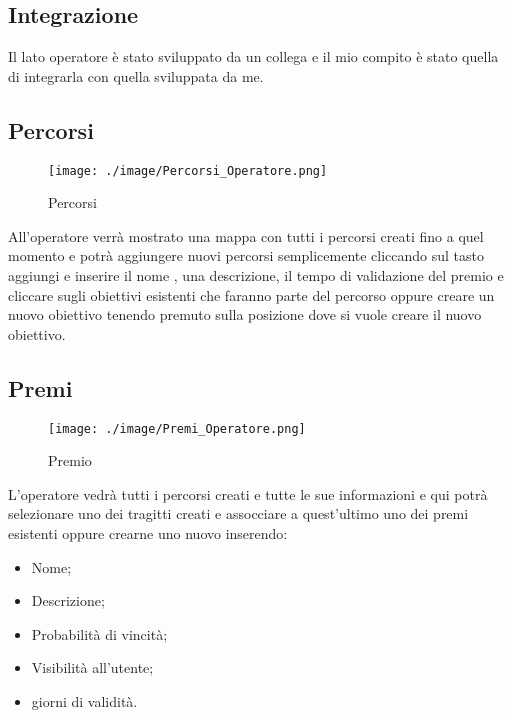 \subsection{Integrazione}
\vspace{2em}

Il lato operatore è stato sviluppato da un collega e il mio compito è stato quella di integrarla con quella sviluppata da me.
\clearpage

\subsection{Percorsi}
\vspace{2em}

\begin{wrapfigure}{L}{0.45\textwidth}
\centering
\texttt{[image: ./image/Percorsi\_Operatore.png]}
\caption{\label{fig:login}Percorsi}
\end{wrapfigure}

All'operatore verrà mostrato una mappa con tutti i percorsi creati fino a quel momento e potrà aggiungere nuovi percorsi semplicemente cliccando sul tasto aggiungi e inserire il nome , una descrizione, il tempo di validazione del premio e cliccare sugli obiettivi esistenti che faranno parte del percorso oppure creare un nuovo obiettivo tenendo premuto sulla posizione dove si vuole creare il nuovo obiettivo.\\
\clearpage
\subsection{Premi}
\vspace{2em}

\begin{wrapfigure}{L}{0.45\textwidth}
\centering
\texttt{[image: ./image/Premi\_Operatore.png]}
\caption{\label{fig:login}Premio}
\end{wrapfigure}

L'operatore vedrà tutti i percorsi creati e tutte le sue informazioni e qui potrà selezionare uno dei tragitti creati e assocciare a quest'ultimo uno dei premi esistenti oppure crearne uno nuovo inserendo:\\

\begin{itemize}

\item Nome;
\item Descrizione;
\item Probabilità di vincità;
\item Visibilità all'utente;
\item giorni di validità.

\end{itemize}

